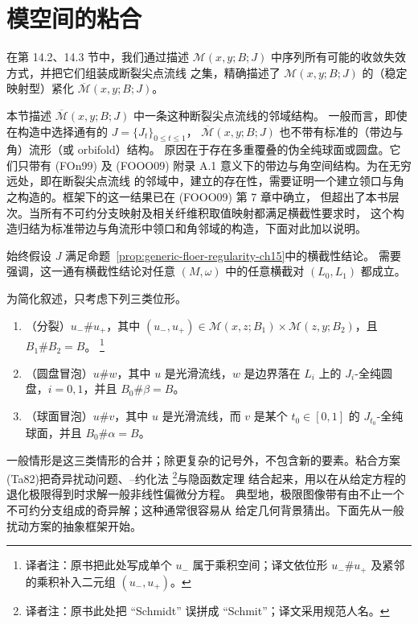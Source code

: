\section{\personFloer{}模空间的粘合}
\label{sec:gluing-floer-moduli-spaces}

在第 14.2、14.3 节中，我们通过描述
$\mathcal M(x,y;B;J)$ 中序列所有可能的收敛失效方式，并把它们组装成断裂尖点流线
之集，精确描述了 $\mathcal M(x,y;B;J)$ 的（稳定映射型）紧化
$\overline{\mathcal M}(x,y;B;J)$。

本节描述 $\overline{\mathcal M}(x,y;B;J)$ 中一条这种断裂尖点流线的邻域结构。
一般而言，即使在构造中选择通有的 $J=\{J_t\}_{0\leq t\leq1}$，
$\overline{\mathcal M}(x,y;B;J)$ 也不带有标准的（带边与角）流形（或 orbifold）结构。
原因在于存在多重覆叠的伪全纯球面或圆盘。它们只带有 (FOn99) 及 (FOOO09)
附录 A.1 意义下的带边与角\personKuranishi{}空间结构。为在无穷远处，即在断裂尖点流线
的邻域中，建立\termKuranishiStructure{}的存在性，需要证明一个建立领口与角之构造的\termGluingTheorem{}。\termKuranishiStructure{}框架下的这一结果已在 (FOOO09) 第 7 章中确立，
但超出了本书层次。当所有不可约分支映射及相关纤维积取值映射都满足横截性要求时，
这个构造归结为标准带边与角流形中领口和角邻域的构造，下面对此加以说明。

始终假设 $J$ 满足命题~\ref{prop:generic-floer-regularity-ch15}中的横截性结论。
需要强调，这一通有横截性结论对任意 $(M,\omega)$ 中的任意横截对 $(L_0,L_1)$ 都成立。

为简化叙述，只考虑下列三类位形。
\begin{enumerate}[label=(\arabic*)]
\item （分裂）$u_-\#u_+$，其中
$(u_-,u_+)\in\mathcal M(x,z;B_1)\times\mathcal M(z,y;B_2)$，且
$B_1\#B_2=B$。
\footnote{译者注：原书把此处写成单个 $u_-$ 属于乘积空间；译文依位形
$u_-\#u_+$ 及紧邻的乘积补入二元组 $(u_-,u_+)$。}
\item （圆盘冒泡）$u\#w$，其中 $u$ 是光滑\personFloer{}流线，$w$ 是边界落在
$L_i$ 上的 $J_i$-全纯圆盘，$i=0,1$，并且 $B_0\#\beta=B$。
\item （球面冒泡）$u\#v$，其中 $u$ 是光滑\personFloer{}流线，而 $v$ 是某个
$t_0\in[0,1]$ 的 $J_{t_0}$-全纯球面，并且 $B_0\#\alpha=B$。
\end{enumerate}
一般情形是这三类情形的合并；除更复杂的记号外，不包含新的要素。\personTaubes{}粘合方案(Ta82)把奇异扰动问题、\personLyapunov{}--\personSchmidt{}约化法
\footnote{译者注：原书此处把 ``Schmidt'' 误拼成 ``Schmit''；译文采用规范人名。}与隐函数定理
结合起来，用以在从给定方程的退化极限得到\termApproximateSolution{}时求解一般非线性偏微分方程。
典型地，极限图像带有由不止一个不可约分支组成的奇异解；这种\termApproximateSolution{}通常很容易从
给定几何背景猜出。下面先从一般扰动方案的抽象框架开始。

